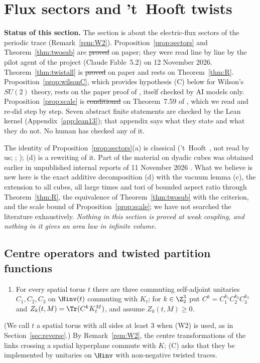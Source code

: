 \section{Flux sectors and 't~Hooft twists}\label{sec:thooft}

\textbf{Status of this section.} The section is about the electric-flux sectors of the periodic trace (Remark~\ref{rem:W2}). Proposition~\ref{prop:sectors} and Theorem~\ref{thm:twosub} are \st{proved} on paper; they were read line by line by the pilot agent of the project (Claude Fable~5.2) on 12 November 2026. Theorem~\ref{thm:twistall} is \st{proved} on paper and rests on Theorem~\ref{thm:R}. Proposition~\ref{prop:wilsonC}, which provides hypothesis (C) below for Wilson's $SU(2)$ theory, rests on the paper proof of \cite{TBv12}, itself checked by AI models only. Proposition~\ref{prop:scale} is \st{conditional} on Theorem~7.59 of \cite{BB26v5}, which we read and re-did step by step. Seven abstract finite statements are checked by the Lean kernel (Appendix~\ref{app:lean13}); that appendix says what they state and what they do not. No human has checked any of it.

The identity of Proposition~\ref{prop:sectors}(a) is classical ('t~Hooft~\cite{tH79}, not read by us; \cite[(2.9) and App.~I]{TY85}; \cite[(8)--(9)]{Kan}); (d) is a rewriting of it. Part of the material on dyadic cubes was obtained earlier in unpublished internal reports of 11 November 2026 \cite{internal}. What we believe is new here is the exact additive decomposition (d) with the vacuum lemma (c), the extension to all cubes, all large times and tori of bounded aspect ratio through Theorem~\ref{thm:R}, the equivalence of Theorem~\ref{thm:twosub} with the criterion, and the scale bound of Proposition~\ref{prop:scale}; we have not searched the literature exhaustively. \emph{Nothing in this section is proved at weak coupling, and nothing in it gives an area law in infinite volume.}

\subsection{Centre operators and twisted partition functions}\label{subsec:C}
\begin{enumerate}
\item[(C)] For every spatial torus $t$ there are three commuting self-adjoint unitaries $C_1,C_2,C_3$ on $\Hinv(t)$ commuting with $K_t$; for $k\in\Z_2^3$ put $C^k=C_1^{k_1}C_2^{k_2}C_3^{k_3}$ and $Z_k(t,M)=\Tr(C^kK_t^M)$, and assume $Z_k(t,M)\ge0$.
\end{enumerate}
(We call $t$ a spatial torus with all sides at least $3$ when (W2) is used, as in Section~\ref{sec:reverse}.) By Remark~\ref{rem:W2}, the centre transformations of the links crossing a spatial hyperplane commute with $K$; (C) asks that they be implemented by unitaries on $\Hinv$ with non-negative twisted traces.

